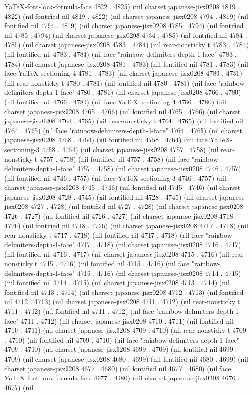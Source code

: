 YaTeX-font-lock-formula-face 4822 . 4825) (nil charset japanese-jisx0208 4819 . 4822) (nil fontified nil 4819 . 4822) (nil charset japanese-jisx0208 4794 . 4819) (nil fontified nil 4794 . 4819) (nil charset japanese-jisx0208 4785 . 4794) (nil fontified nil 4785 . 4794) (nil charset japanese-jisx0208 4784 . 4785) (nil fontified nil 4784 . 4785) (nil charset japanese-jisx0208 4783 . 4784) (nil rear-nonsticky t 4783 . 4784) (nil fontified nil 4783 . 4784) (nil face "rainbow-delimiters-depth-1-face" 4783 . 4784) (nil charset japanese-jisx0208 4781 . 4783) (nil fontified nil 4781 . 4783) (nil face YaTeX-sectioning-4 4781 . 4783) (nil charset japanese-jisx0208 4780 . 4781) (nil rear-nonsticky t 4780 . 4781) (nil fontified nil 4780 . 4781) (nil face "rainbow-delimiters-depth-1-face" 4780 . 4781) (nil charset japanese-jisx0208 4766 . 4780) (nil fontified nil 4766 . 4780) (nil face YaTeX-sectioning-4 4766 . 4780) (nil charset japanese-jisx0208 4765 . 4766) (nil fontified nil 4765 . 4766) (nil charset japanese-jisx0208 4764 . 4765) (nil rear-nonsticky t 4764 . 4765) (nil fontified nil 4764 . 4765) (nil face "rainbow-delimiters-depth-1-face" 4764 . 4765) (nil charset japanese-jisx0208 4758 . 4764) (nil fontified nil 4758 . 4764) (nil face YaTeX-sectioning-3 4758 . 4764) (nil charset japanese-jisx0208 4757 . 4758) (nil rear-nonsticky t 4757 . 4758) (nil fontified nil 4757 . 4758) (nil face "rainbow-delimiters-depth-1-face" 4757 . 4758) (nil charset japanese-jisx0208 4746 . 4757) (nil fontified nil 4746 . 4757) (nil face YaTeX-sectioning-3 4746 . 4757) (nil charset japanese-jisx0208 4745 . 4746) (nil fontified nil 4745 . 4746) (nil charset japanese-jisx0208 4728 . 4745) (nil fontified nil 4728 . 4745) (nil charset japanese-jisx0208 4727 . 4728) (nil fontified nil 4727 . 4728) (nil charset japanese-jisx0208 4726 . 4727) (nil fontified nil 4726 . 4727) (nil charset japanese-jisx0208 4718 . 4726) (nil fontified nil 4718 . 4726) (nil charset japanese-jisx0208 4717 . 4718) (nil rear-nonsticky t 4717 . 4718) (nil fontified nil 4717 . 4718) (nil face "rainbow-delimiters-depth-1-face" 4717 . 4718) (nil charset japanese-jisx0208 4716 . 4717) (nil fontified nil 4716 . 4717) (nil charset japanese-jisx0208 4715 . 4716) (nil rear-nonsticky t 4715 . 4716) (nil fontified nil 4715 . 4716) (nil face "rainbow-delimiters-depth-1-face" 4715 . 4716) (nil charset japanese-jisx0208 4714 . 4715) (nil fontified nil 4714 . 4715) (nil charset japanese-jisx0208 4713 . 4714) (nil fontified nil 4713 . 4714) (nil charset japanese-jisx0208 4712 . 4713) (nil fontified nil 4712 . 4713) (nil charset japanese-jisx0208 4711 . 4712) (nil rear-nonsticky t 4711 . 4712) (nil fontified nil 4711 . 4712) (nil face "rainbow-delimiters-depth-1-face" 4711 . 4712) (nil charset japanese-jisx0208 4710 . 4711) (nil fontified nil 4710 . 4711) (nil charset japanese-jisx0208 4709 . 4710) (nil rear-nonsticky t 4709 . 4710) (nil fontified nil 4709 . 4710) (nil face "rainbow-delimiters-depth-1-face" 4709 . 4710) (nil charset japanese-jisx0208 4699 . 4709) (nil fontified nil 4699 . 4709) (nil charset japanese-jisx0208 4680 . 4699) (nil fontified nil 4680 . 4699) (nil charset japanese-jisx0208 4677 . 4680) (nil fontified nil 4677 . 4680) (nil face YaTeX-font-lock-formula-face 4677 . 4680) (nil charset japanese-jisx0208 4676 . 4677) (nil 